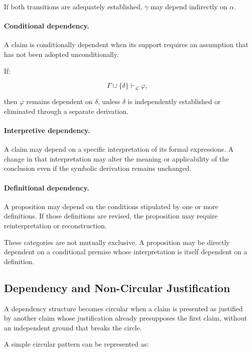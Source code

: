 If both transitions are adequately established, \(\gamma\)
may depend indirectly on \(\alpha\).

\paragraph{Conditional dependency.}

A claim is conditionally dependent when its support requires
an assumption that has not been adopted unconditionally.

If:

\[
    \Gamma \cup \{\delta\}
    \vdash_{\mathcal{L}} \varphi,
\]

then \(\varphi\) remains dependent on \(\delta\), unless
\(\delta\) is independently established or eliminated through
a separate derivation.

\paragraph{Interpretive dependency.}

A claim may depend on a specific interpretation of its
formal expressions. A change in that interpretation may
alter the meaning or applicability of the conclusion even
if the symbolic derivation remains unchanged.

\paragraph{Definitional dependency.}

A proposition may depend on the conditions stipulated by
one or more definitions. If those definitions are revised,
the proposition may require reinterpretation or reconstruction.

These categories are not mutually exclusive. A proposition
may be directly dependent on a conditional premise whose
interpretation is itself dependent on a definition.

\subsection{Dependency and Non-Circular Justification}

A dependency structure becomes circular when a claim is
presented as justified by another claim whose justification
already presupposes the first claim, without an independent
ground that breaks the circle.

A simple circular pattern can be represented as:

